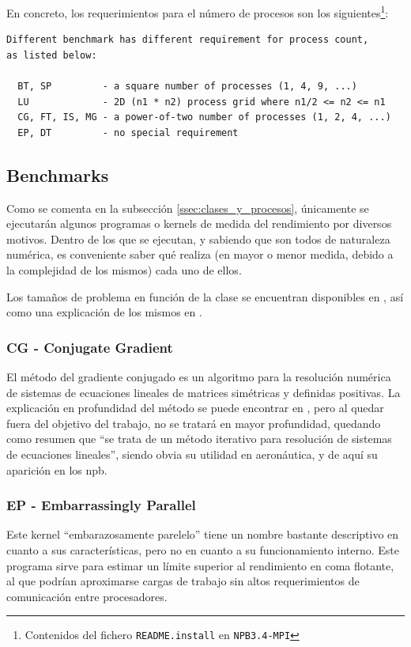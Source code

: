 En concreto, los requerimientos para el número de procesos son los siguientes\footnote{Contenidos del fichero \texttt{README.install} en \texttt{NPB3.4-MPI}}:

\begin{lstlisting}
Different benchmark has different requirement for process count,
as listed below:

  BT, SP         - a square number of processes (1, 4, 9, ...)
  LU             - 2D (n1 * n2) process grid where n1/2 <= n2 <= n1
  CG, FT, IS, MG - a power-of-two number of processes (1, 2, 4, ...)
  EP, DT         - no special requirement
\end{lstlisting}

\subsection{Benchmarks}
\label{ssec:benchmarks}
Como se comenta en la subsección \ref{ssec:clases_y_procesos}, únicamente se ejecutarán algunos programas o kernels de medida del rendimiento por diversos motivos. Dentro de los que se ejecutan, y sabiendo que son todos de naturaleza numérica, es conveniente saber qué realiza (en mayor o menor medida, debido a la complejidad de los mismos) cada uno de ellos.

Los tamaños de problema en función de la clase se encuentran disponibles en \cite{npb_problem_sizes}, así como una explicación de los mismos en \cite{benchmarks1994technical}. 

\subsubsection{CG - Conjugate Gradient}
\label{sssec:benchmarks__cg}
El método del gradiente conjugado es un algoritmo para la resolución numérica de sistemas de ecuaciones lineales de matrices simétricas y definidas positivas. La explicación en profundidad del método se puede encontrar en \cite[2.2.3]{hestenes1952methods}, pero al quedar fuera del objetivo del trabajo, no se tratará en mayor profundidad, quedando como resumen que ``se trata de un método iterativo para resolución de sistemas de ecuaciones lineales'', siendo obvia su utilidad en aeronáutica, y de aquí su aparición en los \acrlong{npb}.

\subsubsection{EP - Embarrassingly Parallel}
\label{sssec:benchmarks__ep}
Este kernel ``embarazosamente parelelo'' tiene un nombre bastante descriptivo en cuanto a sus características, pero no en cuanto a su funcionamiento interno. Este programa sirve para estimar un límite superior al rendimiento en coma flotante, al que podrían aproximarse cargas de trabajo sin altos requerimientos de comunicación entre procesadores.

